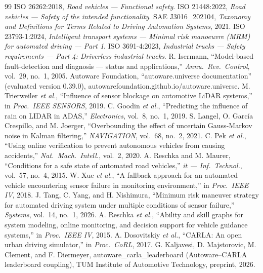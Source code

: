\documentclass[letterpaper, 10pt, conference]{ieeeconf}
\begin{document}
\begin{thebibliography}{99}
\footnotesize
{} ISO 26262:2018, \emph{Road vehicles --- Functional safety}.
 ISO 21448:2022, \emph{Road vehicles --- Safety of the intended functionality}.
 SAE J3016\_202104, \emph{Taxonomy and Definitions for Terms Related to Driving Automation Systems}, 2021.
 ISO 23793-1:2024, \emph{Intelligent transport systems --- Minimal risk manoeuvre (MRM) for automated driving --- Part 1}.
 ISO 3691-4:2023, \emph{Industrial trucks --- Safety requirements --- Part 4: Driverless industrial trucks}.
 R. Isermann, ``Model-based fault-detection and diagnosis --- status and applications,'' \emph{Annu.\ Rev.\ Control}, vol.~29, no.~1, 2005.
 Autoware Foundation, ``autoware.universe documentation'' (evaluated version 0.39.0), autowarefoundation.github.io/autoware.universe.
 M. Trierweiler \emph{et al.}, ``Influence of sensor blockage on automotive LiDAR systems,'' in \emph{Proc.\ IEEE SENSORS}, 2019.
 C. Goodin \emph{et al.}, ``Predicting the influence of rain on LIDAR in ADAS,'' \emph{Electronics}, vol.~8, no.~1, 2019.
 S. Langel, O. Garc\'ia Crespillo, and M. Joerger, ``Overbounding the effect of uncertain Gauss-Markov noise in Kalman filtering,'' \emph{NAVIGATION}, vol.~68, no.~2, 2021.
 C. Pek \emph{et al.}, ``Using online verification to prevent autonomous vehicles from causing accidents,'' \emph{Nat.\ Mach.\ Intell.}, vol.~2, 2020.
 A. Reschka and M. Maurer, ``Conditions for a safe state of automated road vehicles,'' \emph{it --- Inf.\ Technol.}, vol.~57, no.~4, 2015.
 W. Xue \emph{et al.}, ``A fallback approach for an automated vehicle encountering sensor failure in monitoring environment,'' in \emph{Proc.\ IEEE IV}, 2018.
 J. Tang, C. Yang, and H. Nishimura, ``Minimum risk maneuver strategy for automated driving system under multiple conditions of sensor failure,'' \emph{Systems}, vol.~14, no.~1, 2026.
 A. Reschka \emph{et al.}, ``Ability and skill graphs for system modeling, online monitoring, and decision support for vehicle guidance systems,'' in \emph{Proc.\ IEEE IV}, 2015.
 A. Dosovitskiy \emph{et al.}, ``CARLA: An open urban driving simulator,'' in \emph{Proc.\ CoRL}, 2017.
 G. Kaljavesi, D. Majstorovic, M. Clement, and F. Diermeyer, autoware\_carla\_leaderboard (Autoware--CARLA leaderboard coupling), TUM Institute of Automotive Technology, preprint, 2026.
\end{thebibliography}
\end{document}
